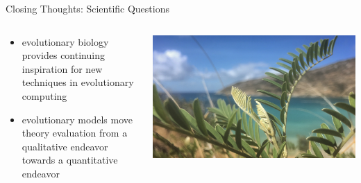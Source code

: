 \begin{frame}{Closing Thoughts: Scientific Questions}
\begin{columns}
\begin{column}{0.6\textwidth}
\begin{itemize}
\item evolutionary biology provides continuing inspiration for new techniques in evolutionary computing
\item evolutionary models move theory evaluation from a qualitative endeavor towards a quantitative endeavor
\end{itemize}
\end{column}
\begin{column}{0.4\textwidth}
\begin{center}
\includegraphics[width=\textwidth,trim={43cm 0 47cm 0},clip]{img/island_fern}
\end{center}
\end{column}
\end{columns}
\end{frame}

